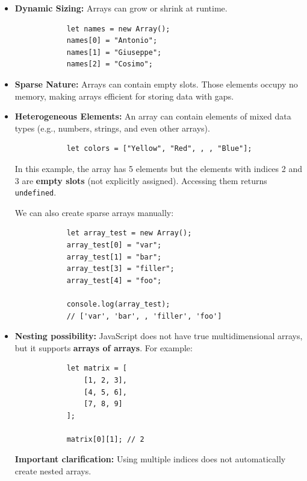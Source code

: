 \documentclass{scrbook}
\begin{document}
\begin{itemize}
    \item
        \textbf{Dynamic Sizing:} Arrays can grow or shrink at runtime.
        \begin{lstlisting}
            let names = new Array();
            names[0] = "Antonio";
            names[1] = "Giuseppe";
            names[2] = "Cosimo";
        \end{lstlisting}

    \item
        \textbf{Sparse Nature:} Arrays can contain empty slots. Those elements occupy no memory, making arrays efficient for storing data with gaps.
    
    \item
        \textbf{Heterogeneous Elements:} An array can contain elements of mixed data types (e.g., numbers, strings, and even other arrays).
        \begin{lstlisting}
            let colors = ["Yellow", "Red", , , "Blue"];
        \end{lstlisting}
        In this example, the array has 5 elements but the elements with indices 2 and 3 are \textbf{empty slots} (not explicitly assigned). Accessing them returns \texttt{undefined}.
        
        We can also create sparse arrays manually:
        \begin{lstlisting}
            let array_test = new Array();
            array_test[0] = "var";
            array_test[1] = "bar";
            array_test[3] = "filler";
            array_test[4] = "foo";
            
            console.log(array_test); 
            // ['var', 'bar', , 'filler', 'foo']
        \end{lstlisting}
    
    \item 
        \textbf{Nesting possibility:} JavaScript does not have true multidimensional arrays, but it supports \textbf{arrays of arrays}. For example:
        \begin{lstlisting}
            let matrix = [
                [1, 2, 3],
                [4, 5, 6],
                [7, 8, 9]
            ];
            
            matrix[0][1]; // 2
        \end{lstlisting}

        \textbf{Important clarification:} Using multiple indices does not automatically create nested arrays.


\end{itemize}
\end{document}
